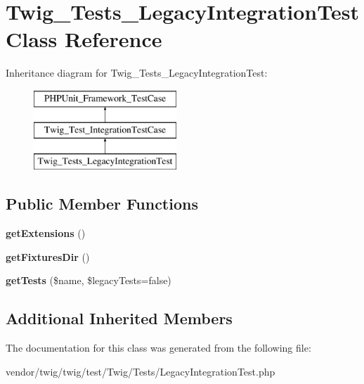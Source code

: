 \hypertarget{classTwig__Tests__LegacyIntegrationTest}{}\section{Twig\+\_\+\+Tests\+\_\+\+Legacy\+Integration\+Test Class Reference}
\label{classTwig__Tests__LegacyIntegrationTest}
Inheritance diagram for Twig\+\_\+\+Tests\+\_\+\+Legacy\+Integration\+Test\+:\begin{figure}[H]
\begin{center}
\leavevmode
\includegraphics[height=3.000000cm]{classTwig__Tests__LegacyIntegrationTest}
\end{center}
\end{figure}
\subsection*{Public Member Functions}
\begin{DoxyCompactItemize}
\item 
{\bfseries get\+Extensions} ()\hypertarget{classTwig__Tests__LegacyIntegrationTest_aaf34d134994d67663da50bb76cff8163}{}\label{classTwig__Tests__LegacyIntegrationTest_aaf34d134994d67663da50bb76cff8163}

\item 
{\bfseries get\+Fixtures\+Dir} ()\hypertarget{classTwig__Tests__LegacyIntegrationTest_af574a914bf19b5df424ad7dce8a5036b}{}\label{classTwig__Tests__LegacyIntegrationTest_af574a914bf19b5df424ad7dce8a5036b}

\item 
{\bfseries get\+Tests} (\$name, \$legacy\+Tests=false)\hypertarget{classTwig__Tests__LegacyIntegrationTest_ae82349d1e2aa37d477ae67050cce256d}{}\label{classTwig__Tests__LegacyIntegrationTest_ae82349d1e2aa37d477ae67050cce256d}

\end{DoxyCompactItemize}
\subsection*{Additional Inherited Members}


The documentation for this class was generated from the following file\+:\begin{DoxyCompactItemize}
\item 
vendor/twig/twig/test/\+Twig/\+Tests/Legacy\+Integration\+Test.\+php\end{DoxyCompactItemize}
